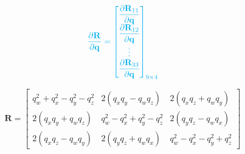 \documentclass{article}
\renewcommand{\Vec}[1]{{\mathbf{#1}}}
\newcommand{\quat}{{\Vec{q}}}
\newcommand{\camRot}{{\Vec{R}}}
\begin{document}
\begin{align}
  \color{cyan}
  \dfrac{\partial{\camRot}}{\partial{\quat}} =
  \begin{bmatrix}
    \dfrac{\partial{\camRot_{11}}}{\partial{\quat}} \\
    \dfrac{\partial{\camRot_{12}}}{\partial{\quat}} \\
    \vdots \\
    \dfrac{\partial{\camRot_{33}}}{\partial{\quat}}
  \end{bmatrix}_{9 \times 4}
\end{align}

\begin{equation}
  \camRot = \begin{bmatrix}
    q_{w}^{2} + q_{x}^{2} - q_{y}^{2} - q_{z}^{2}
    & 2 (q_{x} q_{y} - q_{w} q_{z})
    & 2 (q_{x} q_{z} + q_{w} q_{y}) \\
    2 (q_{x} q_{y} + q_{w} q_{z})
    & q_{w}^{2} - q_{x}^{2} + q_{y}^{2} - q_{z}^{2}
    & 2 (q_{y} q_{z} - q_{w} q_{x}) \\
    2 (q_{x} q_{z} - q_{w} q_{y})
    & 2 (q_{y} q_{z} + q_{w} q_{x})
    & q_{w}^{2} - q_{x}^{2} - q_{y}^{2} + q_{z}^{2}
  \end{bmatrix}
  \nonumber
\end{equation}
\end{document}
